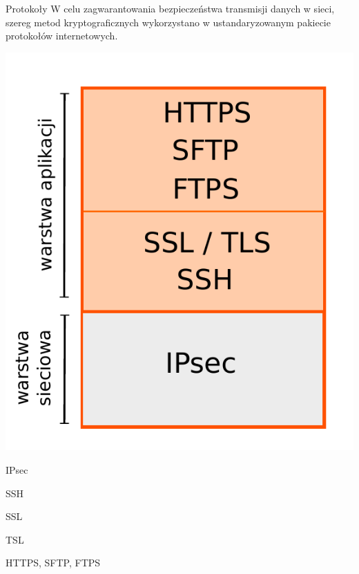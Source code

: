 \begin{frame}{Protokoły}
	W celu zagwarantowania bezpieczeństwa transmisji danych w sieci, szereg metod kryptograficznych wykorzystano w ustandaryzowanym pakiecie protokołów internetowych.
	\begin{center}
		\includegraphics[height=0.4\paperwidth]{images/protocols.pdf}	
	\end{center}

\end{frame}

\begin{frame}{IPsec}
	
\end{frame}

\begin{frame}{SSH}
	
\end{frame}

\begin{frame}{SSL}
	
\end{frame}

\begin{frame}{TSL}
	
\end{frame}

\begin{frame}{HTTPS, SFTP, FTPS}
	
\end{frame}

